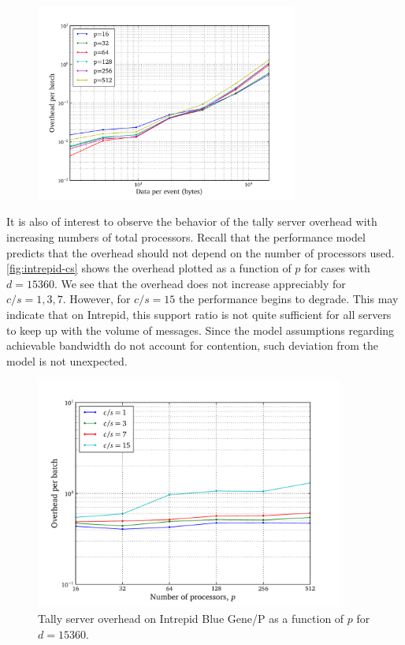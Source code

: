 \begin{figure}[!th]
\begin{floatrow}
     {\includegraphics[width=3.4in]{figures/ch6/results_intrepid_r15}}
  \end{floatrow}
\end{figure}

It is also of interest to observe the behavior of the tally server overhead with
increasing numbers of total processors. Recall that the performance model
predicts that the overhead should not depend on the number of processors
used. \autoref{fig:intrepid-cs} shows the overhead plotted as a function of $p$
for cases with $d = 15360$. We see that the overhead does not increase
appreciably for $c/s = 1, 3, 7$. However, for $c/s = 15$ the performance begins
to degrade. This may indicate that on Intrepid, this support ratio is not quite
sufficient for all servers to keep up with the volume of messages. Since the
model assumptions regarding achievable bandwidth do not account for contention,
such deviation from the model is not unexpected.

\begin{figure}[!tbh]
  \centering
  \includegraphics[width=4in]{figures/ch6/results_intrepid_cs}
  \caption{Tally server overhead on Intrepid Blue Gene/P as a function of $p$
    for $d = 15360$.}
  \label{fig:intrepid-cs}
\end{figure}

